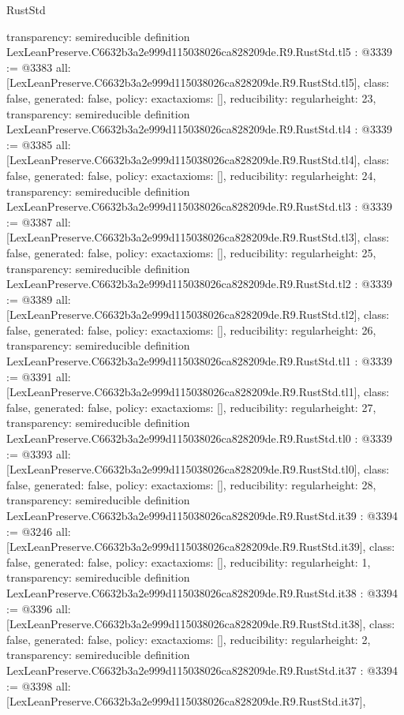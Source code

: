 \begin{lexlean}{RustStd}
\begin{coremodule}
{  transparency: semireducible
}
definition LexLeanPreserve.C6632b3a2e999d115038026ca828209de.R9.RustStd.tl5 : @3339 := @3383 {
  all: [LexLeanPreserve.C6632b3a2e999d115038026ca828209de.R9.RustStd.tl5],
  class: false,
  generated: false,
  policy: exact{axioms: []},
  reducibility: regular{height: 23},
  transparency: semireducible
}
definition LexLeanPreserve.C6632b3a2e999d115038026ca828209de.R9.RustStd.tl4 : @3339 := @3385 {
  all: [LexLeanPreserve.C6632b3a2e999d115038026ca828209de.R9.RustStd.tl4],
  class: false,
  generated: false,
  policy: exact{axioms: []},
  reducibility: regular{height: 24},
  transparency: semireducible
}
definition LexLeanPreserve.C6632b3a2e999d115038026ca828209de.R9.RustStd.tl3 : @3339 := @3387 {
  all: [LexLeanPreserve.C6632b3a2e999d115038026ca828209de.R9.RustStd.tl3],
  class: false,
  generated: false,
  policy: exact{axioms: []},
  reducibility: regular{height: 25},
  transparency: semireducible
}
definition LexLeanPreserve.C6632b3a2e999d115038026ca828209de.R9.RustStd.tl2 : @3339 := @3389 {
  all: [LexLeanPreserve.C6632b3a2e999d115038026ca828209de.R9.RustStd.tl2],
  class: false,
  generated: false,
  policy: exact{axioms: []},
  reducibility: regular{height: 26},
  transparency: semireducible
}
definition LexLeanPreserve.C6632b3a2e999d115038026ca828209de.R9.RustStd.tl1 : @3339 := @3391 {
  all: [LexLeanPreserve.C6632b3a2e999d115038026ca828209de.R9.RustStd.tl1],
  class: false,
  generated: false,
  policy: exact{axioms: []},
  reducibility: regular{height: 27},
  transparency: semireducible
}
definition LexLeanPreserve.C6632b3a2e999d115038026ca828209de.R9.RustStd.tl0 : @3339 := @3393 {
  all: [LexLeanPreserve.C6632b3a2e999d115038026ca828209de.R9.RustStd.tl0],
  class: false,
  generated: false,
  policy: exact{axioms: []},
  reducibility: regular{height: 28},
  transparency: semireducible
}
definition LexLeanPreserve.C6632b3a2e999d115038026ca828209de.R9.RustStd.it39 : @3394 := @3246 {
  all: [LexLeanPreserve.C6632b3a2e999d115038026ca828209de.R9.RustStd.it39],
  class: false,
  generated: false,
  policy: exact{axioms: []},
  reducibility: regular{height: 1},
  transparency: semireducible
}
definition LexLeanPreserve.C6632b3a2e999d115038026ca828209de.R9.RustStd.it38 : @3394 := @3396 {
  all: [LexLeanPreserve.C6632b3a2e999d115038026ca828209de.R9.RustStd.it38],
  class: false,
  generated: false,
  policy: exact{axioms: []},
  reducibility: regular{height: 2},
  transparency: semireducible
}
definition LexLeanPreserve.C6632b3a2e999d115038026ca828209de.R9.RustStd.it37 : @3394 := @3398 {
  all: [LexLeanPreserve.C6632b3a2e999d115038026ca828209de.R9.RustStd.it37],
}
\end{coremodule}
\end{lexlean}
